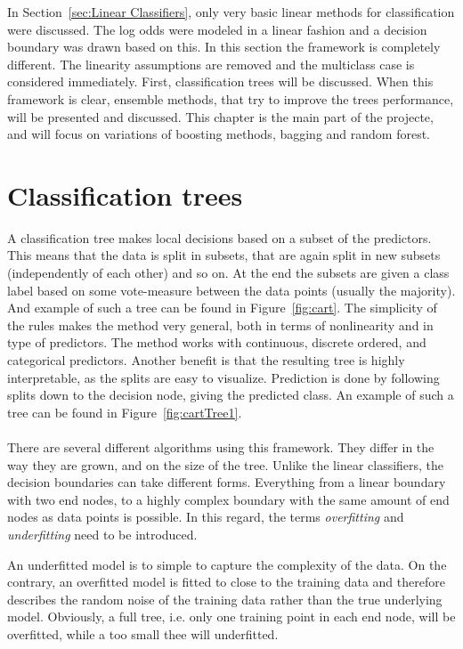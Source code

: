 In Section~\ref{sec:Linear Classifiers}, only very basic linear methods for classification were discussed. The log odds were modeled in a linear fashion and a decision boundary was drawn based on this. In this section the framework is completely different. The linearity assumptions are removed and the multiclass case is considered immediately. 
First, classification trees will be discussed. When this framework is clear, ensemble methods, that try to improve the trees performance, will be presented and discussed. This chapter is the main part of the projecte, and will focus on variations of boosting methods, bagging and random forest. 
%
\section{Classification trees}
\label{sub:Classification trees}
A classification tree makes local decisions based on a subset of the predictors. This means that the data is split in subsets, that are again split in new subsets (independently of each other) and so on. 
At the end the subsets are given a class label based on some vote-measure between the data points (usually the majority).
And example of such a tree can be found in Figure~\ref{fig:cart}.
The simplicity of the rules makes the method very general, both in terms of nonlinearity and in type of predictors. The method works with continuous, discrete ordered, and categorical predictors. Another benefit is that the resulting tree is highly interpretable, as the splits are easy to visualize. Prediction is done by following splits down to the decision node, giving the predicted class. An example of such a tree can be found in Figure~\ref{fig:cartTree1}.\\
\\
There are several different algorithms using this framework. They differ in the way they are grown, and on the size of the tree.
Unlike the linear classifiers, the decision boundaries can take different forms. Everything from a linear boundary with two end nodes, to a highly complex boundary with the same amount of end nodes as data points is possible. In this regard, the terms \textit{overfitting} and \textit{underfitting} need to be introduced. 

An underfitted model is to simple to capture the complexity of the data. On the contrary, an overfitted model is fitted to close to the training data and therefore describes the random noise of the training data rather than the true underlying model.  Obviously, a full tree, i.e. only one training point in each end node, will be overfitted, while a too small thee will underfitted. 

